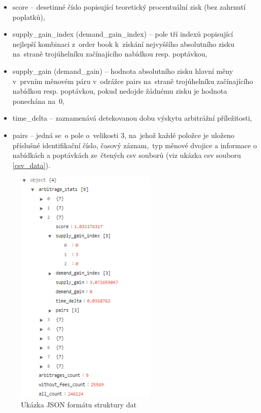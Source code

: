 \documentclass[thesis=B,czech]{FITthesis}[2019/03/21]
\begin{document}
\begin{itemize}
    \item score -- desetinné číslo popisující teoretický procentuální zisk (bez zahrnutí poplatků),
    \item supply\_gain\_index (demand\_gain\_index) -- pole tří indexů popisující nejlepší kombinaci z~order book k~získání nejvyššího absolutního zisku na~straně trojúhelníku začínajícího nabídkou resp. poptávkou,
    \item supply\_gain (demand\_gain) -- hodnota absolutního zisku hlavní měny v~prvním měnovém páru v~odrážce pairs na~straně trojúhelníku začínajícího nabídkou resp. poptávkou, pokud nedojde žádnému zisku je hodnota ponechána na~0,
    \item time\_delta -- zaznamenává detekovanou dobu výskytu arbitrážní \linebreak příležitosti, 
    \item pairs -- jedná se~o pole o~velikosti 3, na~jehož každé položce je uloženo příslušné identifikační číslo, časový záznam,~typ měnové dvojice a informace o nabídkách a poptávkách \linebreak ze~čtených csv souborů (viz ukázka csv souboru \ref{csv_data}).
\end{itemize}
\begin{figure}\centering
	\includegraphics[width=0.6\textwidth]{images/json_data.PNG}
	\caption{Ukázka JSON formátu struktury dat}\label{json_data}
\end{figure}
\end{document}
